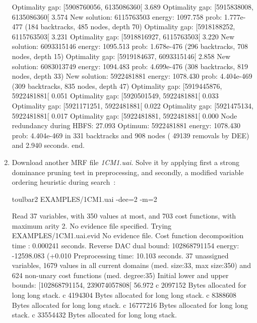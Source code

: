 \begin{enumerate}
{\begin{DoxyCode}
Optimality gap: [5908760056, 6135086360[ 3.689 %
Optimality gap: [5915838008, 6135086360[ 3.574 %
New solution: 6115763503 energy: 1097.758 prob: 1.777e-477 (184 backtracks, 485 nodes, depth 70)
Optimality gap: [5918188252, 6115763503[ 3.231 %
Optimality gap: [5918816927, 6115763503[ 3.220 %
New solution: 6093315146 energy: 1095.513 prob: 1.678e-476 (296 backtracks, 708 nodes, depth 15)
Optimality gap: [5919184637, 6093315146[ 2.858 %
New solution: 6083013749 energy: 1094.483 prob: 4.699e-476 (308 backtracks, 819 nodes, depth 33)
New solution: 5922481881 energy: 1078.430 prob: 4.404e-469 (309 backtracks, 835 nodes, depth 47)
Optimality gap: [5919445876, 5922481881[ 0.051 %
Optimality gap: [5920501549, 5922481881[ 0.033 %
Optimality gap: [5921171251, 5922481881[ 0.022 %
Optimality gap: [5921475134, 5922481881[ 0.017 %
Optimality gap: [5922481881, 5922481881[ 0.000 %
Node redundancy during HBFS: 27.093 %
Optimum: 5922481881 energy: 1078.430 prob: 4.404e-469 in 331 backtracks and 908 nodes ( 49139 removals by DEE) and 2.940 seconds.
end.
\end{DoxyCode}}
\item Download another MRF file {\em 1CM1.uai}. Solve it by applying first a strong dominance pruning test in preprocessing, and secondly, a modified variable ordering heuristic during search~\cite{Schiex14a}:
\begin{DoxyCode}
	toulbar2 EXAMPLES/1CM1.uai -dee=2 -m=2
\end{DoxyCode}
{\scriptsize
\begin{DoxyCode}
Read 37 variables, with 350 values at most, and 703 cost functions, with maximum arity 2.
No evidence file specified. Trying EXAMPLES/1CM1.uai.evid
No evidence file. 
Cost function decomposition time : 0.000241 seconds.
Reverse DAC dual bound: 102868791154 energy: -12598.083 (+0.010%
Preprocessing time: 10.103 seconds.
37 unassigned variables, 1679 values in all current domains (med. size:33, max size:350) and 624 non-unary cost functions (med. degree:35)
Initial lower and upper bounds: [102868791154, 239074057808[ 56.972%
c 2097152 Bytes allocated for long long stack.
c 4194304 Bytes allocated for long long stack.
c 8388608 Bytes allocated for long long stack.
c 16777216 Bytes allocated for long long stack.
c 33554432 Bytes allocated for long long stack.

\end{DoxyCode}}
\end{enumerate}

